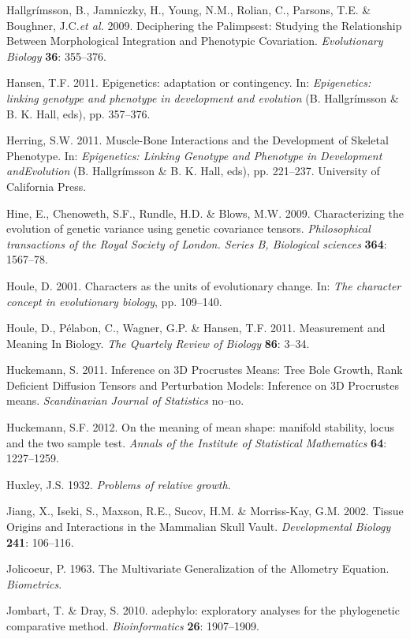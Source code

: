 \documentclass[12pt,twoside]{report}
\begin{document}
Hallgrímsson, B., Jamniczky, H., Young, N.M., Rolian, C., Parsons, T.E.
\& Boughner, J.C.\emph{et al.} 2009. Deciphering the Palimpsest:
Studying the Relationship Between Morphological Integration and
Phenotypic Covariation. \emph{Evolutionary Biology} \textbf{36}:
355--376.

Hansen, T.F. 2011. Epigenetics: adaptation or contingency. In:
\emph{Epigenetics: linking genotype and phenotype in development and
evolution} (B. Hallgrímsson \& B. K. Hall, eds), pp. 357--376.

Herring, S.W. 2011. Muscle-Bone Interactions and the Development of
Skeletal Phenotype. In: \emph{Epigenetics: Linking Genotype and
Phenotype in Development andEvolution} (B. Hallgrímsson \& B. K. Hall,
eds), pp. 221--237. University of California Press.

Hine, E., Chenoweth, S.F., Rundle, H.D. \& Blows, M.W. 2009.
Characterizing the evolution of genetic variance using genetic
covariance tensors. \emph{Philosophical transactions of the Royal
Society of London. Series B, Biological sciences} \textbf{364}:
1567--78.

Houle, D. 2001. Characters as the units of evolutionary change. In:
\emph{The character concept in evolutionary biology}, pp. 109--140.

Houle, D., Pélabon, C., Wagner, G.P. \& Hansen, T.F. 2011. Measurement
and Meaning In Biology. \emph{The Quartely Review of Biology}
\textbf{86}: 3--34.

Huckemann, S. 2011. Inference on 3D Procrustes Means: Tree Bole Growth,
Rank Deficient Diffusion Tensors and Perturbation Models: Inference on
3D Procrustes means. \emph{Scandinavian Journal of Statistics} no--no.

Huckemann, S.F. 2012. On the meaning of mean shape: manifold stability,
locus and the two sample test. \emph{Annals of the Institute of
Statistical Mathematics} \textbf{64}: 1227--1259.

Huxley, J.S. 1932. \emph{Problems of relative growth}.

Jiang, X., Iseki, S., Maxson, R.E., Sucov, H.M. \& Morriss-Kay, G.M.
2002. Tissue Origins and Interactions in the Mammalian Skull Vault.
\emph{Developmental Biology} \textbf{241}: 106--116.

Jolicoeur, P. 1963. The Multivariate Generalization of the Allometry
Equation. \emph{Biometrics}.

Jombart, T. \& Dray, S. 2010. adephylo: exploratory analyses for the
phylogenetic comparative method. \emph{Bioinformatics} \textbf{26}:
1907--1909.
\end{document}
